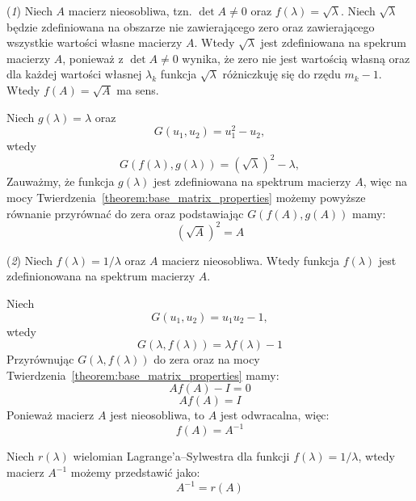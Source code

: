(\textit{1}) Niech $A$ macierz nieosobliwa, tzn. $\det{A} \ne 0$ oraz $f(\lambda) = \sqrt{\lambda}$. Niech $\sqrt{\lambda}$ będzie zdefiniowana na obszarze nie zawierającego zero oraz zawierającego wszystkie wartości własne macierzy $A$. Wtedy $\sqrt{\lambda}$ jest zdefiniowana na spekrum macierzy $A$, ponieważ z $\det{A} \ne 0$ wynika, że zero nie jest wartością własną oraz dla każdej wartości własnej $\lambda_k$ funkcja $\sqrt{\lambda}$ różniczkuję się do rzędu $m_k - 1$. Wtedy $f(A) = \sqrt{A}$ ma sens.

Niech $g(\lambda) = \lambda$ oraz
$$G(u_1, u_2) = u_1^2 - u_2,$$
wtedy
$$
    G(f(\lambda), g(\lambda)) = (\sqrt{\lambda})^2 - \lambda,
$$
Zauważmy, że funkcja $g(\lambda)$ jest zdefiniowana na spektrum macierzy $A$, więc na mocy Twierdzenia~\ref{theorem:base_matrix_properties} możemy powyższe równanie przyrównać do zera oraz podstawiając $G(f(A), g(A))$ mamy:
\begin{equation}\label{eq:sqrt_matrix}
    (\sqrt{A})^2 = A
\end{equation}

(\textit{2}) Niech $f(\lambda) = 1/\lambda$ oraz $A$ macierz nieosobliwa. Wtedy funkcja $f(\lambda)$ jest zdefinionowana na spektrum macierzy $A$. 

Niech
$$G(u_1, u_2) = u_1u_2 - 1,$$
wtedy
$$G(\lambda, f(\lambda)) = \lambda f(\lambda)  - 1$$
Przyrównując $G(\lambda, f(\lambda))$ do zera oraz na mocy Twierdzenia~\ref{theorem:base_matrix_properties} mamy:
$$ Af(A) - I = 0$$
$$ Af(A) = I$$
Ponieważ macierz $A$ jest nieosobliwa, to $A$ jest odwracalna, więc:
\begin{equation}\label{eq:invert_matrix_function}
    f(A) = A^{-1}
\end{equation}

Niech $r(\lambda)$ wielomian Lagrange'a--Sylwestra dla funkcji $f(\lambda) = 1/\lambda$, wtedy macierz $A^{-1}$ możemy przedstawić jako:
\begin{equation}\label{eq:invert_matrix_to_poly}
    A^{-1} = r(A)
\end{equation}
